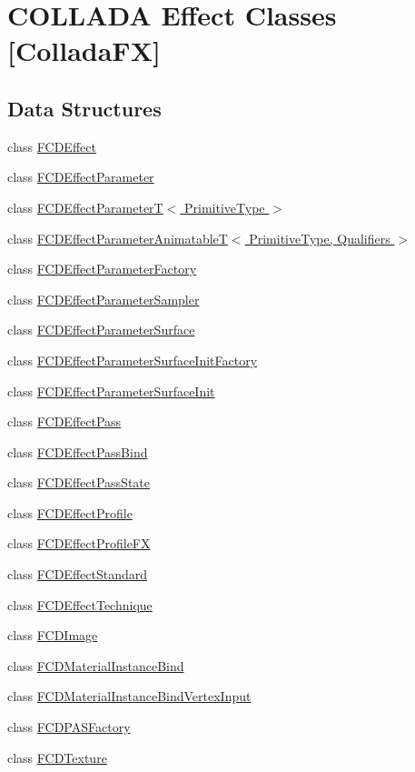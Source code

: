 \hypertarget{group__FCDEffect}{
\section{COLLADA Effect Classes \mbox{[}ColladaFX\mbox{]}}
\label{group__FCDEffect}
}
\subsection*{Data Structures}
\begin{DoxyCompactItemize}
\item 
class \hyperlink{classFCDEffect}{FCDEffect}
\item 
class \hyperlink{classFCDEffectParameter}{FCDEffectParameter}
\item 
class \hyperlink{classFCDEffectParameterT}{FCDEffectParameterT$<$ PrimitiveType $>$}
\item 
class \hyperlink{classFCDEffectParameterAnimatableT}{FCDEffectParameterAnimatableT$<$ PrimitiveType, Qualifiers $>$}
\item 
class \hyperlink{classFCDEffectParameterFactory}{FCDEffectParameterFactory}
\item 
class \hyperlink{classFCDEffectParameterSampler}{FCDEffectParameterSampler}
\item 
class \hyperlink{classFCDEffectParameterSurface}{FCDEffectParameterSurface}
\item 
class \hyperlink{classFCDEffectParameterSurfaceInitFactory}{FCDEffectParameterSurfaceInitFactory}
\item 
class \hyperlink{classFCDEffectParameterSurfaceInit}{FCDEffectParameterSurfaceInit}
\item 
class \hyperlink{classFCDEffectPass}{FCDEffectPass}
\item 
class \hyperlink{classFCDEffectPassBind}{FCDEffectPassBind}
\item 
class \hyperlink{classFCDEffectPassState}{FCDEffectPassState}
\item 
class \hyperlink{classFCDEffectProfile}{FCDEffectProfile}
\item 
class \hyperlink{classFCDEffectProfileFX}{FCDEffectProfileFX}
\item 
class \hyperlink{classFCDEffectStandard}{FCDEffectStandard}
\item 
class \hyperlink{classFCDEffectTechnique}{FCDEffectTechnique}
\item 
class \hyperlink{classFCDImage}{FCDImage}
\item 
class \hyperlink{classFCDMaterialInstanceBind}{FCDMaterialInstanceBind}
\item 
class \hyperlink{classFCDMaterialInstanceBindVertexInput}{FCDMaterialInstanceBindVertexInput}
\item 
class \hyperlink{classFCDPASFactory}{FCDPASFactory}
\item 
class \hyperlink{classFCDTexture}{FCDTexture}
\end{DoxyCompactItemize}
